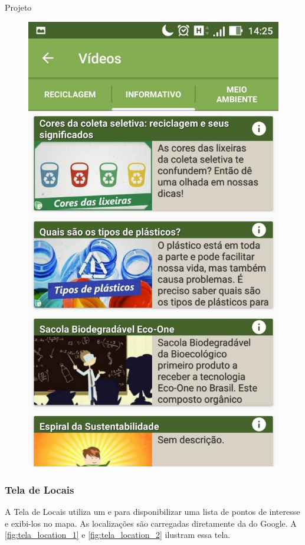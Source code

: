 \documentclass[
	12pt,				%
	openany,			%
	twoside,			%
	a4paper,			%
	english,			%
	french,				%
	spanish,			%
	brazil				%
	]{abntex2}
\begin{document}
\begin{chapter}{Projeto}
\begin{figure}[htb]
\begin{minipage}{0.45\textwidth}
    \includegraphics[scale=0.35]{media/tela_videos_2.jpg}
     \label{fig:tela_videos_2}
  \end{minipage}
\end{figure}

\newpage
\subsubsection{Tela de Locais}
A Tela de Locais utiliza um  e  para disponibilizar uma lista de pontos de interesse e exibi-los no mapa. As localizações são carregadas diretamente da  do Google. A \autoref{fig:tela_location_1} e \autoref{fig:tela_location_2} ilustram essa tela.


\end{chapter}
\end{document}
